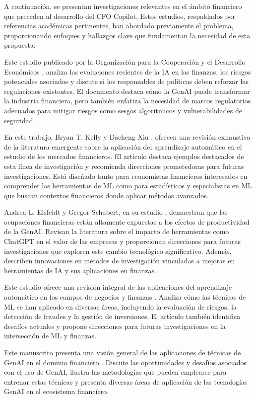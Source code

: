 \documentclass[12pt,letterpaper,oneside]{report}
\renewcommand{\_}{\UnderscoreOriginal\allowbreak}
\begin{document}
A continuación, se presentan investigaciones relevantes en el ámbito financiero que preceden al desarrollo del CFO Copilot. Estos estudios, respaldados por referencias académicas pertinentes, han abordado previamente el problema, proporcionando enfoques y hallazgos clave que fundamentan la necesidad de esta propuesta:

Este estudio publicado por la Organización para la Cooperación y el Desarrollo Económicos \parencite{Oecd2023}, analiza las evoluciones recientes de la IA en las finanzas, los riesgos potenciales asociados y discute si los responsables de políticas deben reforzar las regulaciones existentes. El documento destaca cómo la GenAI puede transformar la industria financiera, pero también enfatiza la necesidad de marcos regulatorios adecuados para mitigar riesgos como sesgos algorítmicos y vulnerabilidades de seguridad.

En este trabajo, Bryan T. Kelly y Dacheng Xiu \parencite{Kelly2023}, ofrecen una revisión exhaustiva de la literatura emergente sobre la aplicación del aprendizaje automático en el estudio de los mercados financieros. El artículo destaca ejemplos destacados de esta línea de investigación y recomienda direcciones prometedoras para futuras investigaciones. Está diseñado tanto para economistas financieros interesados en comprender las herramientas de ML como para estadísticos y especialistas en ML que buscan contextos financieros donde aplicar métodos avanzados.

Andrea L. Eisfeldt y Gregor Schubert, en su estudio \parencite{Eisfeldt2025}, demuestran que las ocupaciones financieras están altamente expuestas a los efectos de productividad de la GenAI. Revisan la literatura sobre el impacto de herramientas como ChatGPT en el valor de las empresas y proporcionan direcciones para futuras investigaciones que exploren este cambio tecnológico significativo. Además, describen innovaciones en métodos de investigación vinculadas a mejoras en herramientas de IA y sus aplicaciones en finanzas.

Este estudio ofrece una revisión integral de las aplicaciones del aprendizaje automático en los campos de negocios y finanzas \parencite{Gao2024}. Analiza cómo las técnicas de ML se han aplicado en diversas áreas, incluyendo la evaluación de riesgos, la detección de fraudes y la gestión de inversiones. El artículo también identifica desafíos actuales y propone direcciones para futuras investigaciones en la intersección de ML y finanzas.

Este manuscrito presenta una visión general de las aplicaciones de técnicas de GenAI en el dominio financiero \parencite{Desai2024}. Discute las oportunidades y desafíos asociados con el uso de GenAI, ilustra las metodologías que pueden emplearse para entrenar estas técnicas y presenta diversas áreas de aplicación de las tecnologías GenAI en el ecosistema financiero.
\end{document}
